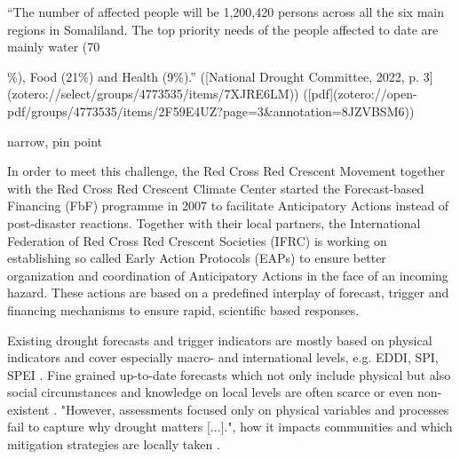“The number of affected people will be 1,200,420 persons across all the six main regions in Somaliland. The top priority needs of the people affected to date are mainly water (70{\%), Food (21\%) and Health (9\%).” ([National Drought Committee, 2022, p. 3](zotero://select/groups/4773535/items/7XJRE6LM)) ([pdf](zotero://open-pdf/groups/4773535/items/2F59E4UZ?page=3&annotation=8JZVBSM6))


narrow, pin point







In order to meet this challenge, the Red Cross Red Crescent Movement together with the Red Cross Red Crescent Climate Center started the Forecast-based Financing (FbF) programme in 2007 to facilitate Anticipatory Actions instead of post-disaster reactions. Together with their local partners, the International Federation of Red Cross Red Crescent Societies (IFRC) is working on establishing so called Early Action Protocols (EAPs) to ensure better organization and coordination of Anticipatory Actions in the face of an incoming hazard. These actions are based on a predefined interplay of forecast, trigger and financing mechanisms to ensure rapid, scientific based responses.

Existing drought forecasts and trigger indicators are mostly based on physical indicators and cover especially macro- and international levels, e.g. EDDI, SPI, SPEI . Fine grained up-to-date forecasts which not only include physical but also social circumstances and knowledge on local levels are often scarce or even non-existent . "However, assessments focused only on physical variables and processes fail to capture why drought matters [...]."\autocite[3]{lackstromBackyardHydroclimatologyCitizen2022}, how it impacts communities and which mitigation strategies are locally taken .\newline

}

